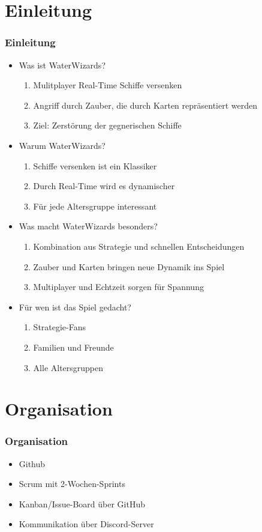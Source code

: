 \documentclass{beamer}
\begin{document}
\section{Einleitung}
\begin{frame}
\frametitle{Einleitung}
\begin{itemize}
  \item Was ist WaterWizards?
  \begin{enumerate}
    \item Mulitplayer Real-Time Schiffe versenken
    \item Angriff durch Zauber, die durch Karten repräsentiert werden
    \item Ziel: Zerstörung der gegnerischen Schiffe
  \end{enumerate}
  \item Warum WaterWizards?
  \begin{enumerate}
    \item Schiffe versenken ist ein Klassiker
    \item Durch Real-Time wird es dynamischer
    \item Für jede Altersgruppe interessant
  \end{enumerate}
  \item Was macht WaterWizards besonders?
    \begin{enumerate}
      \item Kombination aus Strategie und schnellen Entscheidungen
      \item Zauber und Karten bringen neue Dynamik ins Spiel
      \item Multiplayer und Echtzeit sorgen für Spannung
    \end{enumerate}
  \item Für wen ist das Spiel gedacht?
    \begin{enumerate}
      \item Strategie-Fans
      \item Familien und Freunde
      \item Alle Altersgruppen
    \end{enumerate}
\end{itemize}
\end{frame}

\section{Organisation}
\begin{frame}
  \frametitle{Organisation}
  \begin{itemize}
    \item Github
    \item Scrum mit 2-Wochen-Sprints
    \item Kanban/Issue-Board über GitHub
    \item Kommunikation über Discord-Server
  \end{itemize}
\end{frame}
\end{document}
